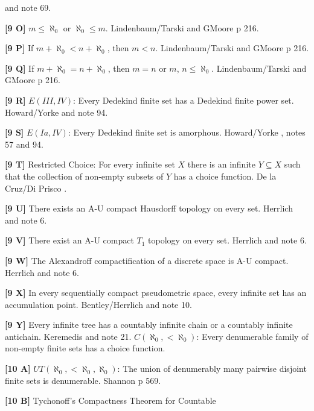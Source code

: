 and note 69.
\smallskip
\item{}{\bf [9 O]} $m\le \aleph_0$ or $\aleph_0\le m$.
\ac{Lindenbaum/Tarski} \cite{1926} and G\. \ac{Moore} \cite{1982} p 216.
\smallskip
\item{}{\bf [9 P]} If $m + \aleph_0 < n + \aleph_0$, then $m < n$.
\ac{Lindenbaum/Tarski} \cite{1926} and G\. \ac{Moore} \cite{1982} p 216.
\smallskip
\item{}{\bf [9 Q]} If $m + \aleph_0 = n + \aleph_0$, then $m = n$ or
$m$, $n \le\aleph_0$. \ac{Lindenbaum/Tarski} \cite{1926} and G\. \ac{Moore}
\cite{1982} p 216.
\smallskip
\item{}{\bf [9 R]} $E(III,IV)$: Every Dedekind finite set has a Dedekind
finite power set.  \ac{Howard/Yorke} \cite{1989} and note 94.
\smallskip
\item{}{\bf [9 S]} $E(Ia,IV)$:  Every Dedekind finite set is amorphous.
\ac{Howard/Yorke} \cite{1989}, notes 57 and 94.
\smallskip
\item{}{\bf [9 T]} Restricted Choice:  For every infinite set $X$ there
is an infinite $Y\subseteq X$ such that the collection of non-empty
subsets of $Y$ has a choice function.  De la Cruz/Di \ac{Prisco}
\cite{1998a}.
\smallskip
\item{}{\bf [9 U]} There exists an A-U compact Hausdorff topology on
every set.  \ac{Herrlich} \cite{1996a} and note 6.
\smallskip
\item{}{\bf [9 V]}  There exist an A-U compact $T_1$ topology on every
set. \ac{Herrlich} \cite{1996a} and note 6.
\smallskip
\item{}{\bf [9 W]}  The Alexandroff compactification of a discrete space
is A-U compact.  \ac{Herrlich} \cite{1996a} and note 6.
\smallskip
\item{}{\bf [9 X]} In every sequentially compact pseudometric space,
every infinite set has an accumulation point. \ac{Bentley/Herrlich}
\cite{1998} and note 10.
\smallskip
\item{}{\bf [9 Y]} Every infinite tree has a countably infinite chain
or a countably infinite antichain. \ac{Keremedis} \cite{1999a} and
note 21.
\medskip
{}  $C(\aleph_{0},< \aleph_{0})$:  Every denumerable
family of non-empty finite sets has a choice function.
\smallskip
\item{}{\bf [10 A]}  $UT(\aleph_{0},< \aleph_{0},\aleph_{0})$:  The
union of denumerably many pairwise disjoint finite sets is  denumerable.
\ac{Shannon} \cite{1988} p 569.
\smallskip
\item{}{\bf [10 B]}  Tychonoff's Compactness Theorem for Countable
